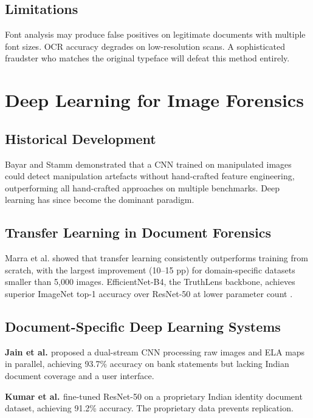 \documentclass[12pt,a4paper,oneside]{report}
\begin{document}
\subsection{Limitations}

Font analysis may produce false positives on legitimate documents with multiple
font sizes. OCR accuracy degrades on low-resolution scans. A sophisticated
fraudster who matches the original typeface will defeat this method entirely.

\section{Deep Learning for Image Forensics}
\label{sec:dl_lit}

\subsection{Historical Development}

Bayar and Stamm \cite{bayar2016} demonstrated that a CNN trained on manipulated
images could detect manipulation artefacts without hand-crafted feature
engineering, outperforming all hand-crafted approaches on multiple benchmarks.
Deep learning has since become the dominant paradigm.

\subsection{Transfer Learning in Document Forensics}

Marra et al. \cite{marra2019} showed that transfer learning consistently
outperforms training from scratch, with the largest improvement (10--15 pp)
for domain-specific datasets smaller than 5,000 images. EfficientNet-B4, the
TruthLens backbone, achieves superior ImageNet top-1 accuracy over ResNet-50
at lower parameter count \cite{tan2019efficientnet}.

\subsection{Document-Specific Deep Learning Systems}

\textbf{Jain et al. \cite{jain2021}} proposed a dual-stream CNN processing
raw images and ELA maps in parallel, achieving 93.7\% accuracy on bank
statements but lacking Indian document coverage and a user interface.

\textbf{Kumar et al. \cite{kumar2022}} fine-tuned ResNet-50 on a proprietary
Indian identity document dataset, achieving 91.2\% accuracy. The proprietary
data prevents replication.
\end{document}
